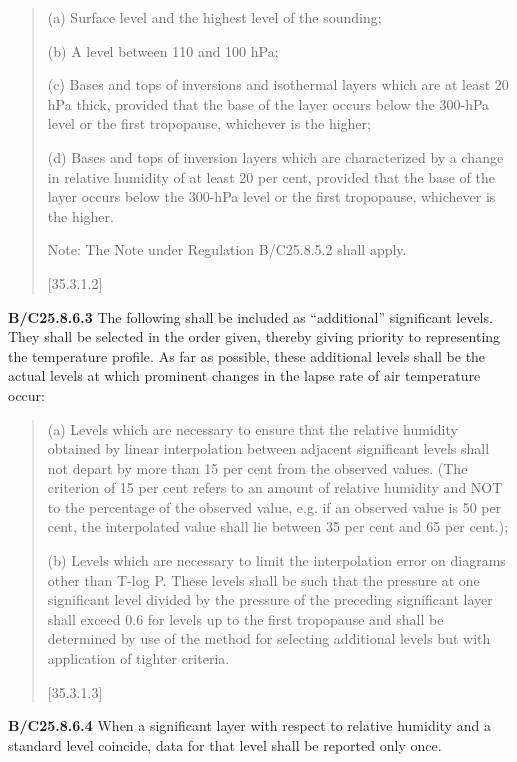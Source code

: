 \begin{quote}
(a) Surface level and the highest level of the sounding;

(b) A level between 110 and 100 hPa;

(c) Bases and tops of inversions and isothermal layers which are at least 20 hPa thick, provided that the base of the layer occurs below the 300-hPa level or the first tropopause, whichever is the higher;

(d) Bases and tops of inversion layers which are characterized by a change in relative humidity of at least 20 per cent, provided that the base of the layer occurs below the 300-hPa level or the first tropopause, whichever is the higher.

Note: The Note under Regulation B/C25.8.5.2 shall apply.

{[}35.3.1.2{]}
\end{quote}

\textbf{B/C25.8.6.3} The following shall be included as ``additional'' significant levels. They shall be selected in the order given, thereby giving priority to representing the temperature profile. As far as possible, these additional levels shall be the actual levels at which prominent changes in the lapse rate of air temperature occur:

\begin{quote}
(a) Levels which are necessary to ensure that the relative humidity obtained by linear interpolation between adjacent significant levels shall not depart by more than 15 per cent from the observed values. (The criterion of 15 per cent refers to an amount of relative humidity and NOT to the percentage of the observed value, e.g. if an observed value is 50 per cent, the interpolated value shall lie between 35 per cent and 65 per cent.);

(b) Levels which are necessary to limit the interpolation error on diagrams other than T-log P. These levels shall be such that the pressure at one significant level divided by the pressure of the preceding significant layer shall exceed 0.6 for levels up to the first tropopause and shall be determined by use of the method for selecting additional levels but with application of tighter criteria.

{[}35.3.1.3{]}
\end{quote}

\textbf{B/C25.8.6.4} When a significant layer with respect to relative humidity and a standard level coincide, data for that level shall be reported only once.

